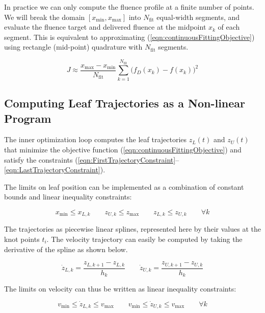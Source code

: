 In practice we can only compute the fluence profile at a finite number of points.
We will break the domain $[x_\text{min}, x_\text{max}]$ into $N_\text{fit}$ equal-width segments,
and evaluate the fluence target and delivered fluence at the midpoint $x_k$ of each segment.
This is equivalent to approximating (\ref{eqn:continuousFittingObjective}) using rectangle (mid-point)
quadrature with $N_\text{fit}$ segments.

\begin{equation}
  J \approx \frac{x_\text{max} - x_\text{min}}{N_\text{fit}}
  \sum_{k = 1}^{N_\text{fit}} \! \bigg( f_D(x_k) - f(x_k) \bigg)^2
  \label{eqn:discreteFittingObjective}
\end{equation}

\subsection{Computing Leaf Trajectories as a Non-linear Program}
\label{sec:LeafTrajectoryAsNLP}

The inner optimization loop computes the leaf trajectories $z_L(t)$ and $z_U(t)$
that minimize the objective function (\ref{eqn:continuousFittingObjective})
and satisfy the constraints (\ref{eqn:FirstTrajectoryConstraint}--\ref{eqn:LastTrajectoryConstraint}).

The limits on leaf position can be implemented as a combination of
constant bounds and linear inequality constraints:

\begin{equation}
  x_\text{min} \leq x_{L, k}
  \quad \quad
  z_{U, k} \leq z_\text{max}
  \quad \quad
  z_{L, k} \leq z_{U, k}
  \quad \quad
  \forall k
  \label{eqn:PositionLimits}
\end{equation}

The trajectories as piecewise linear splines, represented here by their values at the knot points $t_i$.
The velocity trajectory can easily be computed by taking the derivative of the spline as shown below.

\begin{equation}
  \dot{z}_{L, k} = \frac{z_{L, k+1} - z_{L, k}}{h_k}
  \quad \quad
  \dot{z}_{U, k} = \frac{z_{U, k+1} - z_{U, k}}{h_k}
\end{equation}

The limits on velocity can thus be written as linear inequality constraints:

\begin{equation}
  v_\text{min} \leq \dot{z}_{L, k} \leq v_\text{max}
  \quad \quad
  v_\text{min} \leq \dot{z}_{U, k} \leq v_\text{max}
  \quad \quad \forall k
  \label{eqn:VelocityLimits}
\end{equation}

